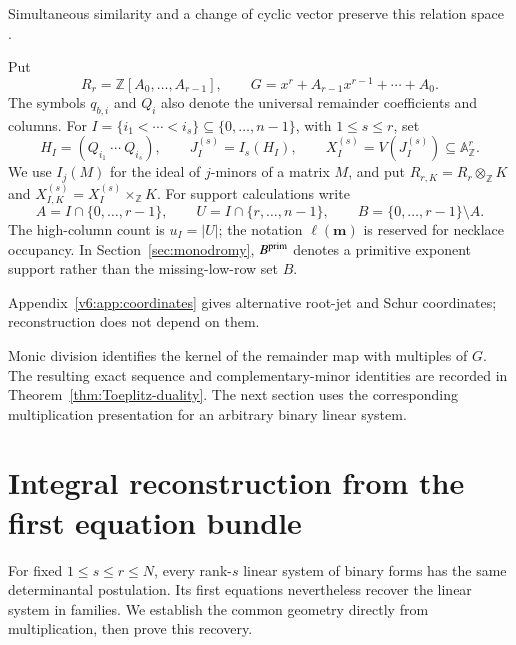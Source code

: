 \documentclass[10pt,fleqn]{article}
\numberwithin{equation}{section}
\newcommand{\A}{\mathbb A}
\begin{document}
Simultaneous similarity and a change of cyclic vector preserve this relation
space \cite[Theorem 2.2]{LiYuanOrbits}.

Put
\begin{equation}\label{eq:intro-universal}
 R_r=\mathbb Z[A_0,\ldots,A_{r-1}],\qquad
 G=x^r+A_{r-1}x^{r-1}+\cdots+A_0.
\end{equation}
The symbols $q_{b,i}$ and $Q_i$ also denote the universal remainder coefficients and
columns.  For $I=\{i_1<\cdots<i_s\}\subseteq\{0,\ldots,n-1\}$, with $1\le s\le r$, set
\begin{equation}\label{eq:intro-block}
 H_I=(Q_{i_1}\ \cdots\ Q_{i_s}),\qquad
 J_I^{(s)}=I_s(H_I),\qquad X_I^{(s)}=V(J_I^{(s)})\subseteq\A_{\mathbb Z}^r.
\end{equation}
We use $I_j(M)$ for the ideal of $j$-minors of a matrix $M$, and put
$R_{r,K}=R_r\otimes_{\mathbb Z}K$ and $X_{I,K}^{(s)}=X_I^{(s)}\times_{\mathbb Z}K$.
For support calculations write
\begin{equation}\label{eq:intro-AUB}
 A=I\cap\{0,\ldots,r-1\},\qquad
 U=I\cap\{r,\ldots,n-1\},\qquad
 B=\{0,\ldots,r-1\}\setminus A.
\end{equation}
The high-column count is $u_I=|U|$; the notation $\ell(\boldsymbol m)$ is
reserved for necklace occupancy.  In Section~\ref{sec:monodromy},
$B^{\rm prim}$ denotes a primitive exponent support rather than the missing-low-row set $B$.


Appendix~\ref{v6:app:coordinates} gives alternative root-jet and Schur
coordinates; reconstruction does not depend on them.


Monic division identifies the kernel of the remainder map with
multiples of $G$.  The resulting exact sequence and complementary-minor
identities are recorded in Theorem~\ref{thm:Toeplitz-duality}.
The next section uses the corresponding multiplication presentation
for an arbitrary binary linear system.

\section{Integral reconstruction from the first equation bundle}\label{sec:reconstruction-new}
\label{sec:toeplitz-secant}\label{v6:lin:section}

For fixed $1\le s\le r\le N$, every rank-$s$ linear system of binary
forms has the same determinantal postulation.  Its first equations
nevertheless recover the linear system in families.  We establish the
common geometry directly from multiplication, then prove this recovery.
\end{document}
